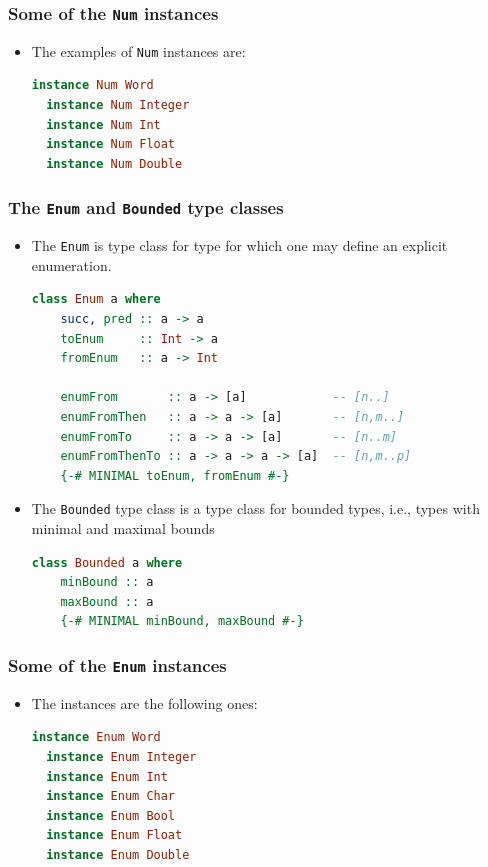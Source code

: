 \documentclass[10pt,pdf,utf8,russian,aspectratio=169]{beamer}
\begin{document}
\begin{frame}[fragile]
  \frametitle{Some of the \verb"Num" instances}

\begin{itemize}
\item The examples of \verb"Num" instances are:

\begin{lstlisting}[language=Haskell]
  instance Num Word
  instance Num Integer
  instance Num Int
  instance Num Float
  instance Num Double
\end{lstlisting}
\end{itemize}
\end{frame}

\begin{frame}[fragile]
  \frametitle{The \verb"Enum" and \verb"Bounded" type classes}

\begin{itemize}
  \item The \verb"Enum" is type class for type for which one may define an explicit enumeration.
\begin{lstlisting}[language=Haskell]
  class Enum a where
    succ, pred :: a -> a
    toEnum     :: Int -> a
    fromEnum   :: a -> Int

    enumFrom       :: a -> [a]            -- [n..]
    enumFromThen   :: a -> a -> [a]       -- [n,m..]
    enumFromTo     :: a -> a -> [a]       -- [n..m]
    enumFromThenTo :: a -> a -> a -> [a]  -- [n,m..p]
    {-# MINIMAL toEnum, fromEnum #-}
  \end{lstlisting}

\item The \verb"Bounded" type class is a type class for bounded types, i.e., types with minimal and maximal bounds
\begin{lstlisting}[language=Haskell]
  class Bounded a where
    minBound :: a
    maxBound :: a
    {-# MINIMAL minBound, maxBound #-}
  \end{lstlisting}
\end{itemize}
\end{frame}

\begin{frame}[fragile]
  \frametitle{Some of the \verb"Enum" instances}

\begin{itemize}
  \item The instances are the following ones:
\begin{lstlisting}[language=Haskell]
  instance Enum Word
  instance Enum Integer
  instance Enum Int
  instance Enum Char
  instance Enum Bool
  instance Enum Float
  instance Enum Double
\end{lstlisting}
\end{itemize}
\end{frame}
\end{document}
